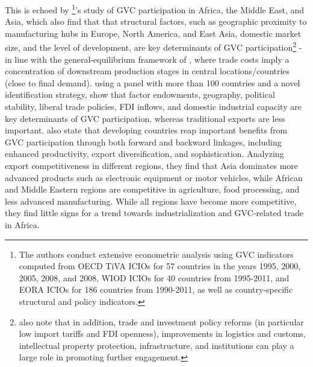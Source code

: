 \documentclass[a4paper]{article}
\begin{document}
This is echoed by \citet{kowalski2015participation}\footnote{The authors conduct extensive econometric analysis using GVC indicators computed from OECD TiVA ICIOs for 57 countries in the years 1995, 2000, 2005, 2008, and 2008, WIOD ICIOs for 40 countries from 1995-2011, and EORA ICIOs for 186 countries from 1990-2011, as well as country-specific structural and policy indicators.}'s study of GVC participation in Africa, the Middle East, and Asia, which also find that that structural factors, such as geographic proximity to manufacturing hubs in Europe, North America, and East Asia, domestic market size, and the level of development, are key determinants of GVC participation\footnote{\citet{kowalski2015participation} also note that in addition, trade and investment policy reforms (in particular low import tariffs and FDI openness), improvements in logistics and customs, intellectual property protection, infrastructure, and institutions can play a large role in promoting further engagement.} - in line with the general-equilibrium framework of \citet{antras2020geography}, where trade costs imply a concentration of downstream production stages in central locations/countries (close to final demand). \citet{fernandes2022determinants} using a panel with more than 100 countries and a novel identification strategy, show that factor endowments, geography, political stability, liberal trade policies, FDI inflows, and domestic industrial capacity are key determinants of GVC participation, whereas traditional exports are less important. 
\citet{kowalski2015participation} also state that developing countries reap important benefits from GVC participation through both forward and backward linkages, including enhanced productivity, export diversification, and sophistication. Analyzing export competitiveness in different regions, they find that Asia dominates more advanced products such as electronic equipment or motor vehicles, while African and Middle Eastern regions are competitive in agriculture, food processing, and less advanced manufacturing. While all regions have become more competitive, they find little signs for a trend towards industrialization and GVC-related trade in Africa. \newline %
\end{document}
